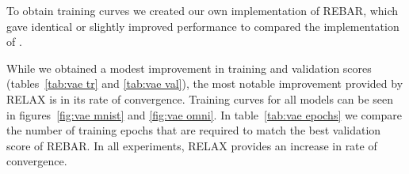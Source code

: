 \documentclass{article}
\newcommand{\E}{\mathbb{E}}
\newcommand{\PT}{\frac{\partial}{\partial \theta}}
\newcommand{\PP}[1]{\frac{\partial}{\partial #1}}
\newcommand{\RELAX}{{\textnormal{RELAX}}}
\begin{document}

To obtain training curves we created our own implementation of REBAR, which gave identical or slightly improved performance to compared the implementation of \citet{tucker2017rebar}.

While we obtained a modest improvement in training and validation scores (tables~\ref{tab:vae tr} and \ref{tab:vae val}), the most notable improvement provided by \RELAX{} is in its rate of convergence.
Training curves for all models can be seen in figures~\ref{fig:vae mnist} and \ref{fig:vae omni}.
In table~\ref{tab:vae epochs} we compare the number of training epochs that are required to match the best validation score of REBAR.
In all experiments, RELAX provides an increase in rate of convergence. 
\end{document}
